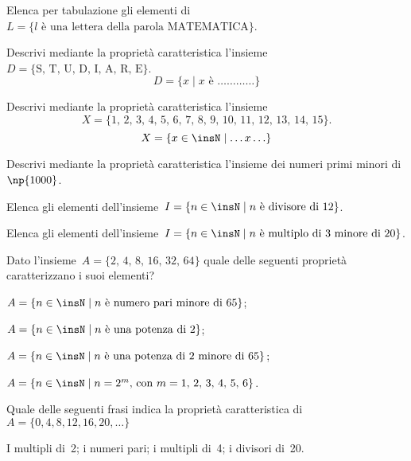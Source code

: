 \begin{esercizio}
\label{ese:5.18}
Elenca per tabulazione gli elementi di~$L=\{l\text{ è una lettera della parola MATEMATICA}\}$.
\end{esercizio}

\begin{esercizio}
\label{ese:5.19}
Descrivi mediante la proprietà caratteristica
l'insieme~$D= \{\text{S, T, U, D, I, A, R, E}\}$.
\[D=\{x\mid x\text{ è }\ldots\ldots\ldots\ldots\}\]
\end{esercizio}


\begin{esercizio}
\label{ese:5.20}
Descrivi mediante la proprietà caratteristica l'insieme
\[X=\{\text{1, 2, 3, 4, 5, 6, 7, 8, 9, 10, 11, 12, 13, 14, 15}\}.\]
\[X=\{x\in\insN\mid \ldots x\ldots\}\]
\end{esercizio}

\begin{esercizio}
\label{ese:5.21}
Descrivi mediante la proprietà caratteristica l'insieme dei numeri primi minori di~$\np{1000}$.
\end{esercizio}

\begin{esercizio}
\label{ese:5.22}
Elenca gli elementi dell'insieme~$I=\{n\in\insN\mid n\text{ è divisore di }12\}$.
\end{esercizio}

\begin{esercizio}
\label{ese:5.23}
Elenca gli elementi dell'insieme~$I=\{n\in\insN\mid n\text{ è multiplo di~3 minore di }20\}$.
\end{esercizio}

\begin{esercizio}[\Ast]
\label{ese:5.24}
Dato l'insieme~$A=\{\text{2, 4, 8, 16, 32, 64}\}$ quale delle seguenti proprietà caratterizzano i suoi elementi?
\begin{enumeratea}
\item $A=\{n\in\insN\mid n \text{ è numero pari minore di 65}\}$;
\item $A=\{n\in\insN\mid n\text{ è una potenza di 2}\}$;
\item $A=\{n\in\insN\mid n\text{ è una potenza di~2 minore di 65}\}$;
\item $A=\{n\in\insN\mid n=2^{m}\text{, con }m=\text{1, 2, 3, 4, 5, 6}\}$.
\end{enumeratea}
\end{esercizio}

\begin{esercizio}[\Ast]
\label{ese:5.25}
Quale delle seguenti frasi indica la proprietà caratteristica
di~$A=\{0, 4, 8, 12, 16, 20, \ldots\}$
\begin{center}
\boxA\quad I multipli di~2; \quad\boxB\quad i numeri pari; \quad\boxC\quad i multipli di~4; \quad\boxD\quad i divisori di~20.
\end{center}
\end{esercizio}

